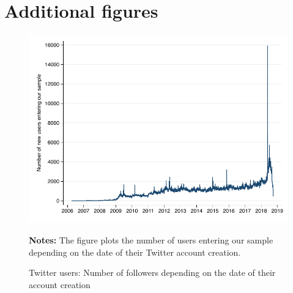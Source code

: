 \clearpage 
\pagebreak
\section{Additional figures \label{Sec:AdFigures}}

\begin{figure}[ht]
\begin{center}
\includegraphics[scale=1]{figures/fig_nb_new_users_daily}
\end{center}
	\begin{spacing}{0.5}
		{\footnotesize \textbf{Notes:} The figure plots the number of users entering our sample depending on the date of their Twitter account creation.}
	\end{spacing}
\vspace{.5cm}	
	\caption{Twitter users: Number of followers depending on the date of their account creation}
	\label{fig:fig_nb_new_users_daily}
\end{figure}


